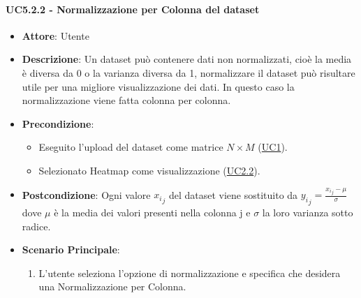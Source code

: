     \paragraph{UC5.2.2 - Normalizzazione per Colonna del dataset}
    \label{uc5.2.2}
    \begin{itemize}
    \item \textbf{Attore}: Utente
    \item \textbf{Descrizione}: Un dataset può contenere dati non normalizzati, cioè la media è diversa da 0 o la varianza diversa da 1, normalizzare il dataset può risultare utile per una migliore visualizzazione dei dati.
    In questo caso la normalizzazione viene fatta colonna per colonna.
    \item \textbf{Precondizione}: 
    \begin{itemize}
        \item Eseguito l'upload del dataset come matrice $N\times M$ (\hyperref[uc1]{UC1}).
        \item Selezionato Heatmap come visualizzazione (\hyperref[uc2.2]{UC2.2}).
    \end{itemize}  
    \item \textbf{Postcondizione}: Ogni valore ${x_i}_j$ del dataset viene sostituito da $ {y_i}_j = \frac{{x_i}_j - \mu}{\sigma}$ dove $\mu$ è la media dei valori presenti nella colonna j e $\sigma$ la loro varianza sotto radice.
    \item \textbf{Scenario Principale}: 
    \begin{enumerate}
        \item L'utente seleziona l'opzione di normalizzazione e specifica che desidera una Normalizzazione per Colonna. 
    \end{enumerate}  
    \end{itemize}
    

